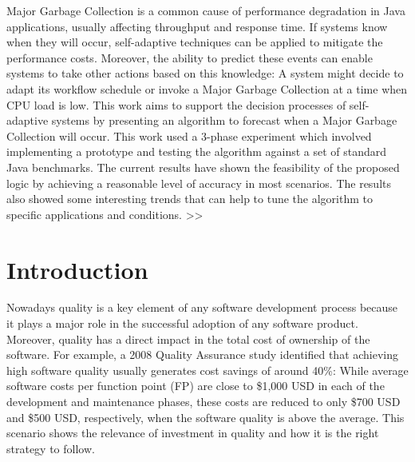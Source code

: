 \documentclass[runningheads,a4paper]{llncs}
\begin{document}
Major Garbage Collection is a common cause of performance degradation in Java
applications, usually affecting throughput and response time. If systems know 
when they will occur, self-adaptive techniques can be applied to mitigate the 
performance costs. Moreover, the ability to predict these events can enable 
systems to take other actions based on this knowledge: A system might decide 
to adapt its workflow schedule or invoke a Major Garbage Collection at a time 
when CPU load is low. This work aims to support the decision processes of 
self-adaptive systems by presenting an algorithm to forecast when a Major 
Garbage Collection will occur. This work used a 3-phase experiment which 
involved implementing a prototype and testing the algorithm against a set of 
standard Java benchmarks. The current results have shown the feasibility of 
the proposed logic by achieving a reasonable level of accuracy in most scenarios. 
The results also showed some interesting trends that can help to tune the 
algorithm to specific applications and conditions.
>>



\section{Introduction}

Nowadays quality is a key element of any software development process because it
plays a major role in the successful adoption of any software product. Moreover,
quality has a direct impact in the total cost of ownership of the software. For
example, a 2008 Quality Assurance study \cite{CapersJones1} identified that achieving 
high software quality usually generates cost savings of around 40\%: While
average software costs per function point (FP) are close to \$1,000 USD in each
of the development and maintenance phases, these costs are reduced to only \$700
USD and \$500 USD, respectively, when the software quality is above the average. 
This scenario shows the relevance of investment in quality and how it is the
right strategy to follow.
\end{document}
